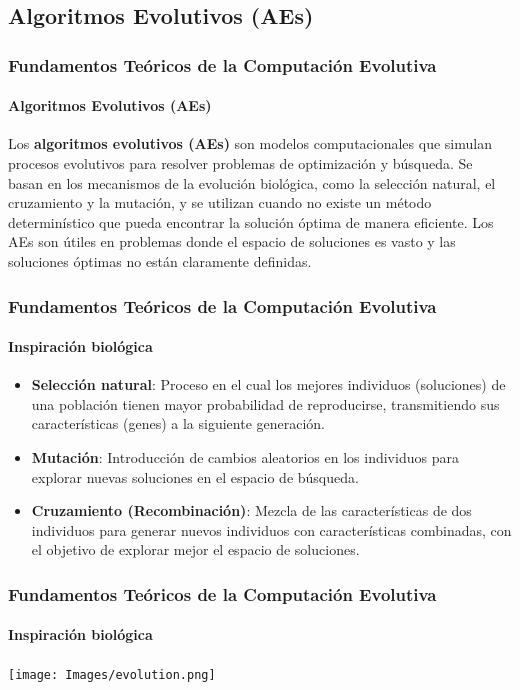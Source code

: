 \documentclass[
	11pt, %
]{beamer}
\begin{document}
\subsection{Algoritmos Evolutivos (AEs)}
\begin{frame}
	\frametitle{Fundamentos Teóricos de la Computación Evolutiva}
	\framesubtitle{Algoritmos Evolutivos (AEs)}
        Los \textbf{algoritmos evolutivos (AEs)} son modelos computacionales que simulan procesos evolutivos para resolver problemas de optimización y búsqueda. Se basan en los mecanismos de la evolución biológica, como la selección natural, el cruzamiento y la mutación, y se utilizan cuando no existe un método determinístico que pueda encontrar la solución óptima de manera eficiente. Los AEs son útiles en problemas donde el espacio de soluciones es vasto y las soluciones óptimas no están claramente definidas.
\end{frame}
\begin{frame}
	\frametitle{Fundamentos Teóricos de la Computación Evolutiva}
	\framesubtitle{Inspiración biológica}
        \begin{itemize}
            \item \textbf{Selección natural}: Proceso en el cual los mejores individuos (soluciones) de una población tienen mayor probabilidad de reproducirse, transmitiendo sus características (genes) a la siguiente generación.
            \item \textbf{Mutación}: Introducción de cambios aleatorios en los individuos para explorar nuevas soluciones en el espacio de búsqueda.
            \item \textbf{Cruzamiento (Recombinación)}: Mezcla de las características de dos individuos para generar nuevos individuos con características combinadas, con el objetivo de explorar mejor el espacio de soluciones.
        \end{itemize}
\end{frame}
\begin{frame}
	\frametitle{Fundamentos Teóricos de la Computación Evolutiva}
	\framesubtitle{Inspiración biológica}
        \begin{center}
            \texttt{[image: Images/evolution.png]}
        \end{center}
\end{frame}

\end{document}
